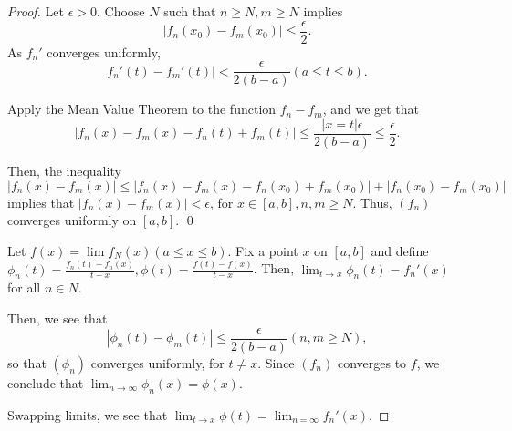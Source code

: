 \documentclass{book}
\begin{document}
\begin{proof}
    Let $\epsilon > 0$. Choose $N$ such that $n \geq N, m \geq N$ implies \[|f_n(x_0) - f_m(x_0)| \leq \frac{\epsilon}{2}.\] As $f_n'$ converges uniformly, \[f_n'(t) - f_m'(t)| < \frac{\epsilon}{2(b-a)} (a \leq t \leq b).\] 

    Apply the Mean Value Theorem to the function $f_n - f_m$, and we get that \[|f_n(x) - f_m(x) - f_n(t) + f_m(t)| \leq \frac{|x = t| \epsilon}{2(b - a)} \leq \frac \epsilon 2.\] 

    Then, the inequality $|f_n(x) - f_m(x)| \leq |f_n(x) - f_m(x) - f_n(x_0) + f_m(x_0)| + |f_n(x_0) - f_m(x_0)|$ implies that $|f_n(x) - f_m(x)| < \epsilon$, for $x \in [a, b], n, m \geq N$. Thus, $(f_n)$ converges uniformly on $[a, b]$. \qed

    Let $f(x) = \lim f_N(x) (a \leq x \leq b)$. Fix a point $x$ on $[a, b]$ and define $\phi_n(t) = \frac{f_n(t) - f_n(x)}{t - x}, \phi(t) = \frac{f(t) - f(x)}{t - x}$. Then, $\lim_{t \to x} \phi_n(t) = f_n'(x)$ for all $n \in N$. 

    Then, we see that \[|\phi_n(t) - \phi_m(t)| \leq \frac{\epsilon}{2(b - a)} (n, m \geq N),\] so that $(\phi_n)$ converges uniformly, for $t \neq x$. Since $(f_n)$ converges to $f$, we conclude that $\lim_{n \to \infty} \phi_n(x) = \phi(x)$.

    Swapping limits, we see that $\lim_{t \to x} \phi(t) = \lim_{n = \infty} f_n'(x)$.
\end{proof}
\end{document}
